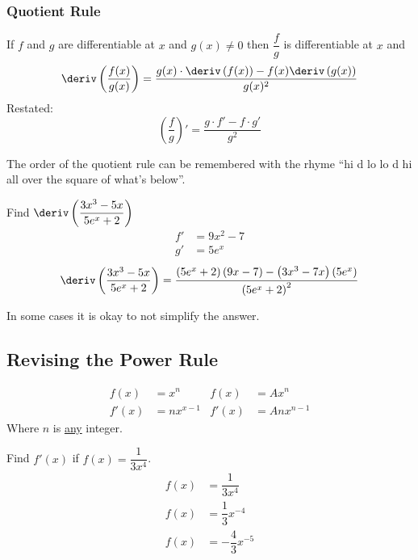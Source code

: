 \subsubsection{Quotient Rule}
\begin{theorem}
    If $f$ and $g$ are differentiable at $x$ and $g(x) \neq 0$ then $\dfrac{f}{g}$ is differentiable at $x$ and
    \begin{equation}
        \deriv\left(\dfrac{f(x)}{g(x)}\right) = \dfrac{g(x) \cdot \deriv\left(f(x)\right) - f(x) \deriv\left(g(x)\right)}{g(x)^2}
    \end{equation}
    Restated:
    \begin{equation}
        \left(\dfrac{f}{g}\right)' = \dfrac{g \cdot f' - f \cdot g'}{g^2}
    \end{equation}
\end{theorem}
\begin{remark}
    The order of the quotient rule can be remembered with the rhyme ``hi d lo lo d hi all over the square of what's below''.
\end{remark}
\begin{example}
    Find $\deriv\left(\dfrac{3x^3 - 5x}{5e^x+2}\right)$
    \begin{align*}
        f' &= 9x^2-7 \\
        g' &= 5e^x
    \end{align*}
    \begin{equation*}
        \deriv\left(\dfrac{3x^3 - 5x}{5e^x+2}\right) = \dfrac{\left(5e^x + 2\right) \left(9x-7\right) - \left(3x^3 - 7x\right)\left(5e^x\right)}{\left(5e^x + 2\right)^2}
    \end{equation*}
\end{example}
\begin{remark}
    In some cases it is okay to not simplify the answer.
\end{remark}
\subsection{Revising the Power Rule}
\begin{align*}
    f(x)  &= x^n       & f(x)  &= Ax^n \\
    f'(x) &= nx^{x- 1} & f'(x) &= Anx^{n-1}
\end{align*}
Where $n$ is \underline{any} integer.
\begin{example}
    Find $f'(x)$ if $f(x) = \dfrac{1}{3x^4}$.
    \begin{align*}
        f(x) &= \dfrac{1}{3x^4} \\
        f(x) &= \dfrac{1}{3} x^{-4} \\
        f(x) &= -\dfrac{4}{3} x^{-5}
    \end{align*}
\end{example}
